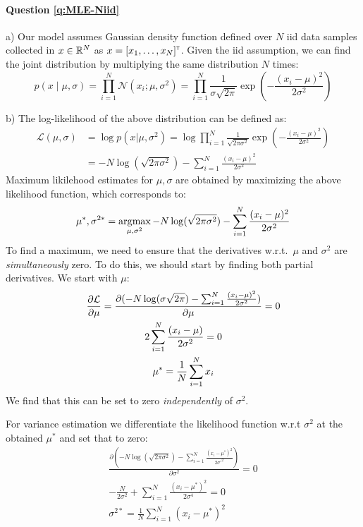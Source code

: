\paragraph{Question \ref{q:MLE-Niid}} 
a) 
    Our model assumes Gaussian density function defined over $N$ iid data samples collected in $x \in \Reals^N$ as $x=[x_1, \dots, x_N]\transpose$.
    Given the iid assumption, we can find the joint distribution by multiplying the same distribution $N$ times:
    $$p(x \mid \mu, \sigma) = \prod_{i=1}^N \mathcal{N}(x_i; \mu, \sigma^2)=\prod_{i=1}^N \frac{1}{\sigma \sqrt{2\pi}}\exp\left(-\frac{(x_i - \mu)^2}{2\sigma^2}\right)$$

b) 
    The log-likelihood of the above distribution can be defined as:
    \begin{align*}
    \mathcal{L}(\mu, \sigma) &= \log p(x|\mu,\sigma^2) = \log \prod_{i=1}^N \frac{1}{\sqrt{2\pi \sigma^2}}\exp\left(-\frac{(x_i - \mu)^2}{2\sigma^2}\right) \\
    &= -N \log (\sqrt{2\pi \sigma^2}) - \sum_{i=1}^N \frac{(x_i - \mu)^2}{2\sigma^2}
    \end{align*}
    Maximum likilehood estimates for $\mu, \sigma$ are obtained by maximizing the above likelihood function, which corresponds to:
    $$\mu^*, \sigma^{2*} = \argmax_{\mu, \sigma^2} -N \log (\sqrt{2\pi \sigma^2}) - \sum_{i=1}^N \frac{(x_i - \mu)^2}{2\sigma^2}$$
    To find a maximum, we need to ensure that the derivatives w.r.t.~$\mu$ and $\sigma^2$ are \emph{simultaneously} zero. To do this, we should start by finding both partial derivatives. We start with $\mu$:
    \begin{gather*}
    \pderiv[\mathcal L]{\mu} = \frac{\partial (-N \log (\sigma \sqrt{2\pi}) - \sum_{i=1}^N \frac{(x_i - \mu)^2}{2\sigma^2})}{\partial \mu} = 0 \\
    2\sum_{i=1}^N \frac{(x_i - \mu)}{2\sigma^2} = 0 \\
    \mu^* = \frac{1}{N} \sum_{i=1}^N x_i
    \end{gather*}
    We find that this can be set to zero \emph{independently} of $\sigma^2$.

    For variance estimation we differentiate the likelihood function w.r.t $\sigma^2$ at the obtained $\mu^*$ and set that to zero:
    \begin{gather}
    \frac{\partial (-N \log (\sqrt{2\pi\sigma^2}) - \sum_{i=1}^N \frac{(x_i - \mu^*)^2}{2\sigma'^2})}{\partial \sigma^2} = 0 \\
    -\frac{N}{2 \sigma^2} + \sum_{i=1}^N \frac{(x_i - \mu^*)^2}{2\sigma^4} = 0 \\
    \sigma^{2*} = \frac{1}{N} \sum_{i=1}^N (x_i - \mu^*)^2
    \end{gather}


